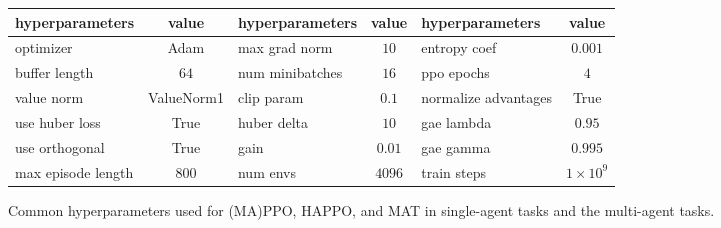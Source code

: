 \begin{tabular}{l c | l c | l c}
    \toprule
    hyperparameters & value & hyperparameters & value & hyperparameters & value \\
    \midrule
    optimizer & Adam & max grad norm & $10$ & entropy coef & $0.001$\\
    buffer length & $64$ & num minibatches & $16$ & ppo epochs & $4$ \\
    value norm & ValueNorm1 & clip param & $0.1$ & normalize advantages & True\\
    use huber loss & True & huber delta & $10$ & gae lambda & $0.95$ \\
    use orthogonal & True & gain & $0.01$ & gae gamma & $0.995$ \\
    max episode length & $800$ & num envs & $4096$ & train steps & $1\times10^{9}$ \\
    \bottomrule
\end{tabular}
\caption{Common hyperparameters used for (MA)PPO, HAPPO, and MAT in single-agent tasks and the multi-agent tasks.}